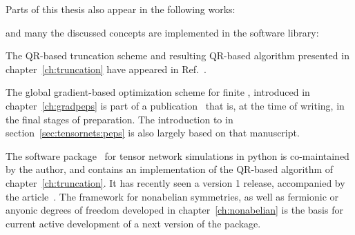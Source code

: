 Parts of this thesis also appear in the following works:

\BiblatexSplitbibDefernumbersWarningOff
\begingroup
\let\clearpage\relax
\makeatletter
\renewcommand{\chapter}{\@gobbletwo}
\makeatother
\printbibliography[keyword={my work}]{}  %
\endgroup

and many the discussed concepts are implemented in the software library:
\BiblatexSplitbibDefernumbersWarningOff
\begingroup
\let\clearpage\relax
\makeatletter
\renewcommand{\chapter}{\@gobbletwo}
\makeatother
\printbibliography[keyword={tenpy citation}]{}  %
\endgroup

The QR-based truncation scheme and resulting QR-based  algorithm presented in chapter~\ref{ch:truncation} have appeared in Ref.~\cite{unfried2023}.



The global gradient-based optimization scheme for finite , introduced in chapter~\ref{ch:gradpeps} is part of a publication~\cite{unfried2024} that is, at the time of writing, in the final stages of preparation.
%
The introduction to  in section~\ref{sec:tensornets:peps} is also largely based on that manuscript. 


\nocite{hauschild2024}
%
%
%
The  software package~\cite{tenpySoftware} for tensor network simulations in python is co-maintained by the author, and contains an implementation of the QR-based  algorithm of chapter~\ref{ch:truncation}.
%
It has recently seen a version 1 release, accompanied by the article~\cite{hauschild2024}.
%
The framework for nonabelian symmetries, as well as fermionic or anyonic degrees of freedom developed in chapter~\ref{ch:nonabelian} is the basis for current active development of a next version of the package.

